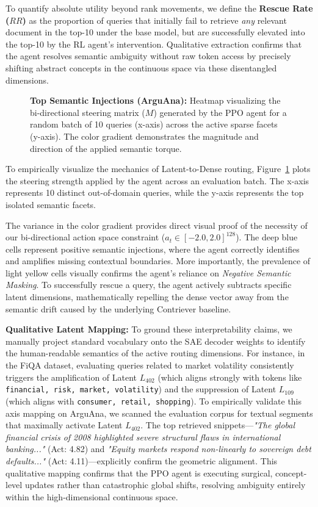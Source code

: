 To quantify absolute utility beyond rank movements, we define the \textbf{Rescue Rate ($RR$)} as the proportion of queries that initially fail to retrieve \textit{any} relevant document in the top-10 under the base model, but are successfully elevated into the top-10 by the RL agent's intervention. Qualitative extraction confirms that the agent resolves semantic ambiguity without raw token access by precisely shifting abstract concepts in the continuous space via these disentangled dimensions.

\begin{figure}[htbp]
  \centering
  \fbox{\rule[-.5cm]{0cm}{4cm} \rule[-.5cm]{4cm}{0cm}} %
  \caption{\textbf{Top Semantic Injections (ArguAna):} Heatmap visualizing the bi-directional steering matrix ($M$) generated by the PPO agent for a random batch of 10 queries (x-axis) across the active sparse facets (y-axis). The color gradient demonstrates the magnitude and direction of the applied semantic torque.}
  \label{fig:heatmap}
\end{figure}

To empirically visualize the mechanics of Latent-to-Dense routing, Figure~\ref{fig:heatmap} plots the steering strength applied by the agent across an evaluation batch. The x-axis represents 10 distinct out-of-domain queries, while the y-axis represents the top isolated semantic facets.

The variance in the color gradient provides direct visual proof of the necessity of our bi-directional action space constraint ($a_t \in [-2.0, 2.0]^{128}$). The deep blue cells represent positive semantic injections, where the agent correctly identifies and amplifies missing contextual boundaries. More importantly, the prevalence of light yellow cells visually confirms the agent's reliance on \textit{Negative Semantic Masking}. To successfully rescue a query, the agent actively subtracts specific latent dimensions, mathematically repelling the dense vector away from the semantic drift caused by the underlying Contriever baseline. 

\textbf{Qualitative Latent Mapping:} To ground these interpretability claims, we manually project standard vocabulary onto the SAE decoder weights to identify the human-readable semantics of the active routing dimensions. For instance, in the FiQA dataset, evaluating queries related to market volatility consistently triggers the amplification of Latent $L_{402}$ (which aligns strongly with tokens like \texttt{financial, risk, market, volatility}) and the suppression of Latent $L_{109}$ (which aligns with \texttt{consumer, retail, shopping}). To empirically validate this axis mapping on ArguAna, we scanned the evaluation corpus for textual segments that maximally activate Latent $L_{402}$. The top retrieved snippets—\textit{"The global financial crisis of 2008 highlighted severe structural flaws in international banking..."} (Act: 4.82) and \textit{"Equity markets respond non-linearly to sovereign debt defaults..."} (Act: 4.11)—explicitly confirm the geometric alignment. This qualitative mapping confirms that the PPO agent is executing surgical, concept-level updates rather than catastrophic global shifts, resolving ambiguity entirely within the high-dimensional continuous space.

